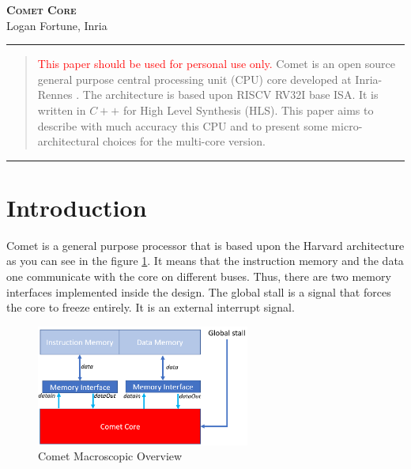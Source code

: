 \documentclass[10pt,letterpaper]{article}
\newcommand{\colorhrule}[3]{\begingroup\color{#1}\rule{#2}{#3}\endgroup}
\begin{document}
\sloppy
\begin{center}
\huge{\textsc{\textbf{Comet Core}}}\\ %
{\footnotesize Logan Fortune, Inria}
\end{center}
	

\begin{center}
\colorhrule{black}{16.5cm}{1.2pt}
\end{center}
\begin{abstract}
\noindent 
\textcolor{red}{This paper should be used for personal use only.} Comet is an open source general purpose central processing unit (CPU) core developed at Inria-Rennes \cite{urlgit}. The architecture is based upon RISCV RV32I base ISA. It is written in $C++$ for High Level Synthesis (HLS). This paper aims to describe with much accuracy this CPU and to present some micro-architectural choices for the multi-core version.
\end{abstract}
\begin{center}
\vspace{-5mm}
\colorhrule{black}{16cm}{0.7pt}
\end{center}

\section{Introduction}\vspace{0.3cm}

Comet is a general purpose processor that is based upon the Harvard architecture as you can see in the figure \ref{fig:macro_one}. It means that the instruction memory and the data one communicate with the core on different buses. Thus, there are two memory interfaces implemented inside the design. The global stall is a signal that forces the core to freeze entirely. It is an external interrupt signal.

\vspace{0.5cm}

\begin{figure}[H]
\centering
\includegraphics[width=7cm]{img/global_macro_1.PNG}
\caption{Comet Macroscopic Overview}
\label{fig:macro_one}
\end{figure}
\end{document}
